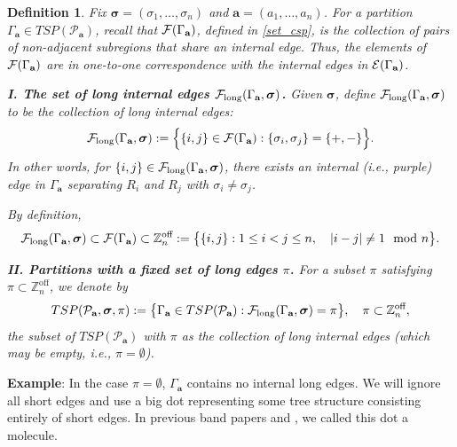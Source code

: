 \documentclass[10pt,reqno]{article}
\theoremstyle{plain} %
\newtheorem{definition}[theorem]{Definition}
\theoremstyle{remark}
\numberwithin{equation}{section}
\begin{document}
 
 

\begin{definition} 
Fix $\boldsymbol{\sigma}=(\sigma_1,\ldots,\sigma_n)$ and $\textbf{a}=(a_1,\ldots,a_n)$. For a partition $\Gamma_{\textbf{a}}\in TSP(\mathcal P_{\textbf{a}})$, recall that ${\cal F}(\Gamma_{\textbf{a}})$, defined in \eqref{set_csp}, is the collection of pairs of non-adjacent subregions that share an internal edge. Thus, the elements of ${\cal F}(\Gamma_{\textbf{a}})$ are in one-to-one correspondence with the internal edges in ${\cal E}(\Gamma_{\textbf{a}})$.

\noindent\textbf{I. The set of long internal edges ${\cal F}_{\mathrm{long}}(\Gamma_{\textbf{a}}, \boldsymbol{\sigma})$.}
Given $\boldsymbol{\sigma}$, define ${\cal F}_{\mathrm{long}}(\Gamma_{\textbf{a}}, \boldsymbol{\sigma})$ to be the collection of long internal edges:
\[
{\cal F}_{\text{long}}(\Gamma_{\textbf{a}}, \boldsymbol{\sigma}) := \Big\{\{i, j\} \in {\cal F}(\Gamma_{\textbf{a}}) : \{\sigma_i, \sigma_j\} = \{+, -\}\Big\}.
\]
In other words, for \(\{i, j\} \in {\cal F}_{\text{long}}(\Gamma_{\textbf{a}}, \boldsymbol{\sigma})\), there exists an internal (i.e., purple) edge in \(\Gamma_{\textbf{a}}\) separating \(R_i\) and \(R_j\) with \(\sigma_i \neq \sigma_j\).

By definition, 
\[
{\cal F}_{\text{long}}(\Gamma_{\textbf{a}}, \boldsymbol{\sigma}) \subset {\cal F}(\Gamma_{\textbf{a}}) \subset \mathbb{Z}_n^{\text{off}} := \big\{\{i, j\} : 1 \leq i < j \leq n, \quad |i - j| \neq 1 \mod n\big\}.
\]


\noindent\textbf{II. Partitions with a fixed set of long edges $\pi$.}
For a subset \(\pi\) satisfying \(\pi \subset \mathbb{Z}_n^{\text{off}}\), we denote by 
\[
TSP(\mathcal{P}_{\textbf{a}}, \boldsymbol{\sigma}, \pi) := \big\{\Gamma_{\textbf{a}} \in TSP(\mathcal{P}_{\textbf{a}}) : {\cal F}_{\text{long}}(\Gamma_{\textbf{a}}, \boldsymbol{\sigma}) = \pi\big\}, \quad \pi \subset \mathbb{Z}_n^{\text{off}},
\]
the subset of \(TSP(\mathcal{P}_{\textbf{a}})\) with \(\pi\) as the collection of long internal  edges (which may be empty, i.e., \(\pi = \emptyset\)).
\end{definition}


\noindent 
{\bf Example}: In the case  $\pi=\emptyset$,    $\Gamma_\textbf{a}$ contains  no internal long edges. We will ignore all  short edges
and use a big dot representing  some tree structure consisting entirely of short edges. 
In previous band papers \cite{yang2021delocalization} and \cite{yang2022delocalization}, we  called this dot a  molecule. 
\end{document}
